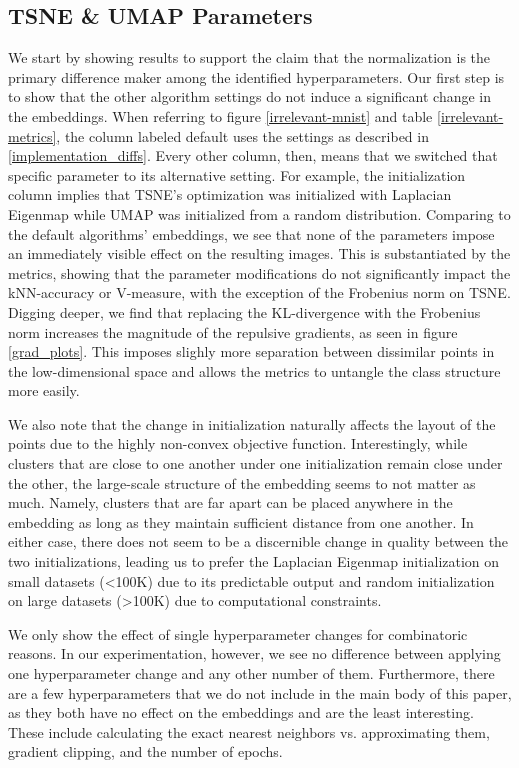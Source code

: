 \documentclass[sigconf, nonacm]{acmart}
\begin{document}
\subsection{TSNE \& UMAP Parameters}
We start by showing results to support the claim that the normalization is the primary difference maker among the identified hyperparameters. Our first step is
to show that the other algorithm settings do not induce a significant change in the embeddings. When referring to figure \ref{irrelevant-mnist} and table
\ref{irrelevant-metrics}, the column labeled default uses the settings as described in \ref{implementation_diffs}. Every other column, then, means that we
switched that specific parameter to its alternative setting. For example, the initialization column implies that TSNE's optimization was initialized with
Laplacian Eigenmap while UMAP was initialized from a random distribution.
Comparing to the default algorithms' embeddings, we see that
none of the parameters impose an immediately visible effect on the resulting images. This is substantiated by the metrics, showing that 
the parameter modifications do not significantly impact the kNN-accuracy or V-measure, with the exception of the Frobenius norm on TSNE. Digging deeper, we find
that replacing the KL-divergence with the Frobenius norm increases the magnitude of the repulsive gradients, as seen in figure \ref{grad_plots}. This imposes
slighly more separation between dissimilar points in the low-dimensional space and allows the metrics to untangle the class structure more easily.

We also note that the change in initialization naturally affects the layout of the points due to the highly non-convex objective function. Interestingly, while
clusters that are close to one another under one initialization remain close under the other, the large-scale structure of the embedding seems to not matter as
much. Namely, clusters that are far apart can be placed anywhere in the embedding as long as they maintain sufficient distance from one another. In either
case, there does not seem to be a discernible change in quality between the two initializations, leading us to prefer the Laplacian Eigenmap initialization on
small datasets (<100K) due to its predictable output and random initialization on large datasets (>100K) due to computational constraints.

We only show the effect of single hyperparameter changes for combinatoric reasons. In our experimentation, however, we see no difference between applying one
hyperparameter change and any other number of them. Furthermore, there are a few hyperparameters that we do not include in the main body of this paper, as they
both have no effect on the embeddings and are the least interesting. These include calculating the exact nearest neighbors vs. approximating them, gradient
clipping, and the number of epochs.
\end{document}

